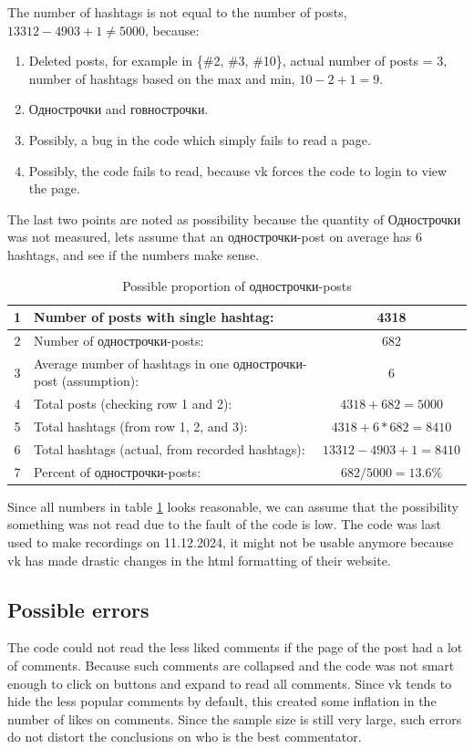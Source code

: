 \documentclass[
	12pt
] {article}
\begin{document}
	The number of hashtags is not equal to the number of posts, $13312 - 4903 + 1 \neq 5000$, because:
	\begin{enumerate}
		\item Deleted posts, for example in \{\#2, \#3, \#10\}, actual number of posts = 3, number of hashtags based on the max and min, $10 - 2 + 1 = 9$.
		\item Однострочки and говнострочки.
		\item Possibly, a bug in the code which simply fails to read a page.
		\item Possibly, the code fails to read, because vk forces the code to login to view the page.
	\end{enumerate}
	The last two points are noted as possibility because the quantity of Однострочки was not measured, lets assume that an однострочки-post on average has 6 hashtags, and see if the numbers make sense.
	
	\begin{table}[H]
		\centering
		\caption{Possible proportion of однострочки-posts}
		\label{table:count-post-one-liners}
		\begin{tabular}{| c | p{6cm} | c |}
			\hline
			1 & Number of posts with single hashtag: & \num{4318} \\
			\hline
			2 & Number of однострочки-posts: & \num{682} \\
			3 & Average number of hashtags in one однострочки-post (assumption): & \num{6} \\
			\hline
			4 & Total posts (checking row 1 and 2): & $4318 + 682 = 5000$ \\
			\hline
			5 & Total hashtags (from row 1, 2, and 3): & $4318 + 6 * 682 = 8410$ \\
			6 & Total hashtags (actual, from recorded hashtags): & $13312 - 4903 + 1 = 8410$ \\
			\hline
			7 & Percent of однострочки-posts: & $682 / 5000 = \num{13.6}\%$ \\
			\hline
		\end{tabular}
	\end{table}
	
	Since all numbers in table \ref{table:count-post-one-liners} looks reasonable, we can assume that the possibility something was not read due to the fault of the code is low. The code was last used to make recordings on 11.12.2024, it might not be usable anymore because vk has made drastic changes in the html formatting of their website.

\subsection{Possible errors}
	The code could not read the less liked comments if the page of the post had a lot of comments. Because such comments are collapsed and the code was not smart enough to click on buttons and expand to read all comments. Since vk tends to hide the less popular comments by default, this created some inflation in the number of likes on comments. Since the sample size is still very large, such errors do not distort the conclusions on who is the best commentator.
	
\end{document}

